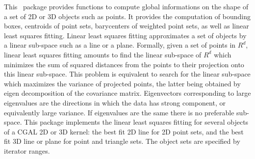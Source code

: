 This \cgal\ package provides functions to compute global informations
on the shape of a set of 2D or 3D objects such as points. It provides the computation of bounding boxes, centroids of point sets, barycenters of weighted point sets, as well as linear least squares fitting. Linear least squares fitting approximates a set of objects by a linear
sub-space such as a line or a plane.
Formally, given a set of points in $R^d$, linear least squares fitting amounts
to find the linear sub-space of $R^d$ which minimizes the sum of squared
distances from the points to their projection onto this linear sub-space. This
problem is equivalent to search for the linear sub-space which maximizes the
variance of projected points, the latter being obtained by eigen decomposition
of the covariance matrix. Eigenvectors corresponding to large eigenvalues are
the directions in which the data has strong component, or equivalently large
variance. If eigenvalues are the same there is no preferable sub-space.
This package implements the linear least squares fitting for
several objects of a CGAL 2D or 3D kernel: the best fit 2D line for 2D
point sets, and the best fit 3D line or plane for point and
triangle sets. The object sets are specified by iterator ranges.

